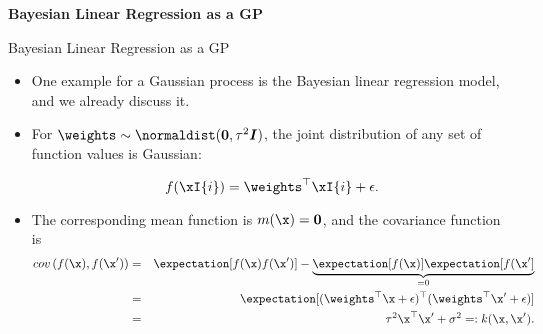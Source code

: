 
\begin{frame}[c]{}
\centering
\huge
\textbf{Bayesian Linear Regression as a GP}
\end{frame}


\begin{frame}[c]{Bayesian Linear Regression as a GP}

\begin{itemize}

\item One example for a Gaussian process is the Bayesian linear regression model, and we already discuss it.
\lz
\item For $\thetab \sim \normaldist(\bm{0}, \tau^2 \id)$, the joint distribution of any set of function values is Gaussian:

$$f(\xI{i}) = \thetab^\top \xI{i} + \epsilon.$$
\vspace{3mm}
\item The corresponding mean function is $m(\x) = \bm{0}$, and the covariance function is
\vspace{-2mm}
\begin{eqnarray*}
cov\,(f(\x), f(\x^\prime)) &=& \expectation[f(\x) f(\x^\prime)] - \underbrace{\expectation[f(\x)] \expectation[f(\x^\prime]}_{= 0} \\ &=& \expectation[(\thetab^\top \x + \epsilon)^\top(\thetab^\top \x^\prime + \epsilon)] \\ &=&  \tau^2 \x^\top\x^\prime + \sigma^2 =: k(\x, \x^\prime).
\end{eqnarray*}

\end{itemize}

\end{frame}


